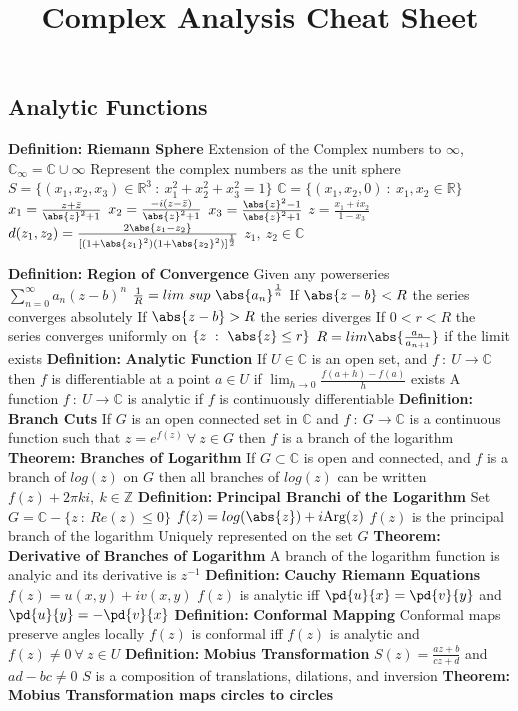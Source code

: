 \documentclass[14pt]{extarticle}
\title{Complex Analysis Cheat Sheet}
\def\Definition{{\color{blue} \textbf{Definition:} }}
\def\Theorem{{\color{red} \textbf{Theorem:} }}
\begin{document}
\maketitle

\begin{outline}		
\section*{Analytic Functions}
	\1	\Definition \textbf{Riemann Sphere}
		\2	Extension of the Complex numbers to $\infty$, 
				$\mathbb{C}_{\infty} = \mathbb{C} \cup \infty$
		\2	Represent the complex numbers as the unit sphere
				$S = \{(x_1,x_2,x_3) \in \mathbb{R}^3~:~x_1^2 + x_2^2 + x_3^2 = 1\}$
			\3	$\mathbb{C} = \{(x_1,x_2,0)~:~x_1,x_2 \in \mathbb{R}\}$
			\3	$x_1 = \frac{z + \bar{z}}{\abs{z}^2 + 1}$
			\3	$x_2 = \frac{-i(z - \bar{z})}{\abs{z}^2 + 1}$
			\3	$x_3 = \frac{\abs{z}^2 - 1}{\abs{z}^2 + 1}$
			\3	$z = \frac{x_1 + ix_2}{1 - x_3}$
			\3	$d(z_1,z_2) = \frac{2\abs{z_1 - z_2}}{[(1 + \abs{z_1}^2)(1 + \abs{z_2}^2)]^{\frac{1}{2}}}$
				\4	$z_1,~z_2 \in \mathbb{C}$

	\1	\Definition \textbf{Region of Convergence}
		\2	Given any powerseries $\sum_{n=0}^{\infty} a_n(z - b)^n$
		\2	$\frac{1}{R} = lim~sup~\abs{a_n}^{\frac{1}{n}}$
			\3	If $\abs{z - b} < R$ the series converges absolutely
			\3	If $\abs{z - b} > R$ the series diverges
			\3	If $0 < r < R$ the series converges uniformly on $\{z~:~\abs{z} \le r\}$
			\3	$R = lim \abs{\frac{a_n}{a_{n+1}}}$ if the limit exists
	\1	\Definition \textbf{Analytic Function}
		\2	If $U \in \mathbb{C}$ is an open set, and $f~:~U \rightarrow \mathbb{C}$
				then $f$ is differentiable at a point $a \in U$ if
				$\lim_{h \rightarrow 0} \frac{f(a + h) - f(a)}{h}$ exists
		\2	A function $f~:~U \rightarrow \mathbb{C}$ is analytic if $f$ is 
				continuously differentiable
	\1	\Definition \textbf{Branch Cuts}
		\2	If $G$ is an open connected set in $\mathbb{C}$ and $f~:~G \rightarrow \mathbb{C}$
				is a continuous function such that $z = e^{f(z)}~\forall~z \in G$ then
				$f$ is a branch of the logarithm
	\1	\Theorem \textbf{Branches of Logarithm}
		\2	If $G \subset \mathbb{C}$ is open and connected, and $f$ is a branch
				of $log(z)$ on $G$ then all branches of $log(z)$ can be written
				$f(z) + 2\pi k i,~k \in \mathbb{Z}$
	\1	\Definition	\textbf{Principal Branchi of the Logarithm}
		\2	Set $G = \mathbb{C} - \{z~:~Re(z) \le 0\}$
		\2	$f(z) = log(\abs{z}) + i \text{Arg}(z)$
		\2	$f(z)$ is the principal branch of the logarithm
			\3	Uniquely represented on the set $G$
	\1	\Theorem	\textbf{Derivative of Branches of Logarithm}
		\2	A branch of the logarithm function is analyic and its derivative is $z^{-1}$
	\1	\Definition \textbf{Cauchy Riemann Equations}
		\2	$f(z) = u(x,y) + iv(x,y)$ 
		\2	$f(z)$ is analytic iff $\pd{u}{x} = \pd{v}{y}$ and $\pd{u}{y} = -\pd{v}{x}$
	\1	\Definition \textbf{Conformal Mapping}
		\2	Conformal maps preserve angles locally
		\2	$f(z)$ is conformal iff $f(z)$ is analytic and $f(z) \ne 0~\forall~z \in U$
	\1	\Definition \textbf{Mobius Transformation}
		\2	$S(z) = \frac{az + b}{cz + d}$ and $ad - bc \ne 0$
		\2	$S$ is a composition of translations, dilations, and inversion
	\1	\Theorem	\textbf{Mobius Transformation maps circles to circles}

\end{outline}
\end{document}
